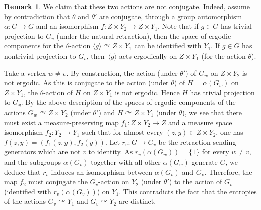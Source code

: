 \documentclass[11pt]{article}
\numberwithin{equation}{section}
\theoremstyle{plain}
\theoremstyle{definition}
\newtheorem{rk}[theo]{Remark}
\let\actson\curvearrowright
\begin{document}
\begin{rk}
We claim that these two actions are not conjugate. Indeed, assume by contradiction that $\theta$ and $\theta'$ are conjugate, through a group automorphism $\alpha:G\to G$ and an isomorphism $f:Z\times Y_2\to Z\times Y_1$. Note that if $g\in G$ has trivial projection to $G_v$ (under the natural retraction), then the space of ergodic components for the $\theta$-action $\langle g\rangle \actson Z\times Y_1$ can be identified with $Y_1$. If $g\in G$ has nontrivial projection to $G_v$, then~$\langle g\rangle$ acts ergodically on $Z\times Y_1$ (for the action $\theta$).

Take a vertex $w\neq v$. By construction, the action (under $\theta'$) of $G_w$ on $Z\times Y_2$ is not ergodic. As this is conjugate to the action (under $\theta$) of $H=\alpha(G_w)$ on $Z\times Y_1$, the $\theta$-action of $H$ on $Z\times Y_1$ is not ergodic. Hence $H$ has trivial projection to $G_{v}$. By the above description of the spaces of ergodic components of the actions $G_w\actson Z\times Y_2$ (under $\theta'$) and $H\actson Z\times Y_1$ (under $\theta$), we see that there must exist a measure-preserving map $f_1:Z\times Y_2\to Z$ and a measure space isomorphism $f_2:Y_2\to Y_1$ such that for almost every $(z,y)\in Z\times Y_2$, one has $f(z,y)=(f_1(z,y),f_2(y))$. Let $r_v:G\to G_v$ be the retraction sending generators which are not $v$ to identity. As $r_v(\alpha(G_w))=\{1\}$ for every $w\neq v$, and the subgroups $\alpha(G_v)$ together with all other $\alpha(G_w)$ generate $G$, we deduce that $r_v$ induces an isomorphism between $\alpha(G_v)$ and $G_v$. Therefore, the map $f_2$ must conjugate the $G_v$-action on $Y_2$ (under $\theta'$) to the action of $G_v$ (identified with $r_v(\alpha(G_v))$) on $Y_1$. This contradicts the fact that the entropies of the actions $G_v\actson Y_1$ and $G_v\actson Y_2$ are distinct.


\end{rk}
\end{document}
